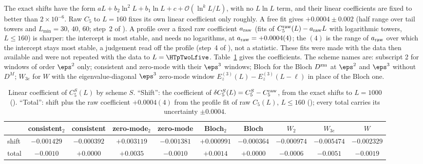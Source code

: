 The exact shifts have the form $aL+b_2\ln^2L+b_1\ln L+c+\mathcal O(\ln^kL/L)$, with no $L\ln L$ term, and their linear
coefficients are fixed to better than $2\times10^{-6}$. Raw $C_5$ to $L=160$ fixes its own linear coefficient only roughly.
A free fit gives $+0.0004\pm0.002$ (half range over tail towers and $L_{\min}=30$, 40, 60; step~2 of
). A profile over a fixed raw coefficient $a_{\rm raw}$ (fits of $C_5^{\rm raw}(L)-a_{\rm
raw}L$ with logarithmic towers, $L\le160$) is sharper: the intercept is most stable, and needs no logarithms, at
$a_{\rm raw}=+0.0004(4)$; the $(4)$ is the range of $a_{\rm raw}$ over which the intercept stays most stable, a
judgement read off the profile (step~4 of ), not a statistic. These fits were made with the data then available and were not repeated with the data to
$L=\HTpTwoLfive$. Table~\ref{d2:tab:c5lin} gives the coefficients. The scheme names are: subscript 2 for windows of order
$\eps^2$ only; consistent and zero-mode with their $\eps^3$ windows; Bloch for the Bloch $D^{\rm zm}$ at $\eps^2$ and
$\eps^3$ without $D^M$; $W_{3e}$ for $W$ with the eigenvalue-diagonal $\eps^3$ zero-mode window
$E_z^{(3)}(L)-E_z^{(3)}(L-\ell)$ in place of the Bloch one.

\begin{table}[ht]
\centering\footnotesize\setlength{\tabcolsep}{2.6pt}\renewcommand{\arraystretch}{1.15}
\begin{tabular}{@{}lccccccccc@{}}
\toprule
 & consistent$_2$ & consistent & zero-mode$_2$ & zero-mode & Bloch$_2$ & Bloch & $W_2$ & $W_{3e}$ & $W$ \\\midrule
shift & $-0.001429$ & $-0.000392$ & $+0.003119$ & $-0.001381$ & $+0.000991$ & $-0.000364$ & $-0.000974$ & $-0.005474$ & $-0.002329$ \\
total & $-0.0010$ & $+0.0000$ & $+0.0035$ & $-0.0010$ & $+0.0014$ & $+0.0000$ & $-0.0006$ & $-0.0051$ & $-0.0019$ \\
\bottomrule
\end{tabular}
\caption{Linear coefficient of $C_5^S(L)$ by scheme $S$. ``Shift'': the coefficient of $\delta C_5^S(L)=C_5^S-C_5^{\rm raw}$,
from the exact shifts to $L=1000$ (). ``Total'': shift plus the raw
coefficient $+0.0004(4)$ from the profile fit of raw $C_5(L)$, $L\le160$ (); every total
carries its uncertainty $\pm0.0004$.}
\label{d2:tab:c5lin}
\end{table}

